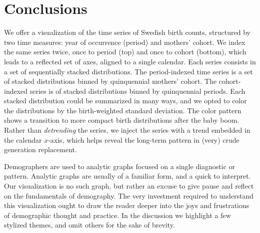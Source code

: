 \documentclass{article}
\begin{document}
\section{Conclusions}
We offer a visualization of the time series of Swedish birth counts, structured by two time measures: year of occurrence (period) and mothers' cohort. We index the same series twice, once to period (top) and once to cohort (bottom), which leads to a reflected set of axes, aligned to a single calendar. Each series consists in a set of sequentially stacked distributions. The period-indexed time series is a set of stacked distributions binned by quinquennial mothers' cohort. The cohort-indexed series is of stacked distributions binned by quinquennial periods. Each stacked distribution could be summarized in many ways, and we opted to color the distributions by the birth-weighted standard deviation. The color pattern shows a transition to more compact birth distributions after the baby boom. Rather than \emph{detrending} the series, we inject the series with a trend embedded in the calendar $x$-axis, which helps reveal the long-term pattern in (very) crude generation replacement.

Demographers are used to analytic graphs focused on a single diagnostic or pattern. Analytic graphs are usually of a familiar form, and a quick to interpret. Our visualization is no such graph, but rather an excuse to give pause and reflect on the fundamentals of demography. The very investment required to understand this visualization ought to draw the reader deeper into the joys and frustrations of demographic thought and practice. In the discussion we highlight a few stylized themes, and omit others for the sake of brevity. 
\end{document}
